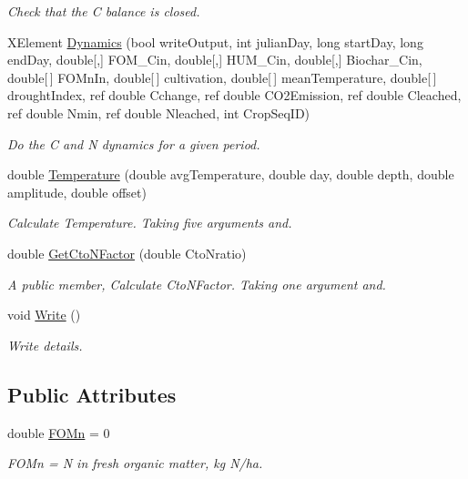 \begin{DoxyCompactItemize}
\begin{DoxyCompactList}\small\item\em Check that the C balance is closed. \end{DoxyCompactList}\item 
X\+Element \mbox{\hyperlink{classctool2_a9443a20fe2c0134438a7e03c9821cee0}{Dynamics}} (bool write\+Output, int julian\+Day, long start\+Day, long end\+Day, double\mbox{[},\mbox{]} F\+O\+M\+\_\+\+Cin, double\mbox{[},\mbox{]} H\+U\+M\+\_\+\+Cin, double\mbox{[},\mbox{]} Biochar\+\_\+\+Cin, double\mbox{[}$\,$\mbox{]} F\+O\+Mn\+In, double\mbox{[}$\,$\mbox{]} cultivation, double\mbox{[}$\,$\mbox{]} mean\+Temperature, double\mbox{[}$\,$\mbox{]} drought\+Index, ref double Cchange, ref double C\+O2\+Emission, ref double Cleached, ref double Nmin, ref double Nleached, int Crop\+Seq\+ID)
\begin{DoxyCompactList}\small\item\em Do the C and N dynamics for a given period. \end{DoxyCompactList}\item 
double \mbox{\hyperlink{classctool2_af3b775757402d284e18dcf32a95f9e40}{Temperature}} (double avg\+Temperature, double day, double depth, double amplitude, double offset)
\begin{DoxyCompactList}\small\item\em Calculate Temperature. Taking five arguments and. \end{DoxyCompactList}\item 
double \mbox{\hyperlink{classctool2_a2376beb1addd3be35eb8a09213ab4003}{Get\+Cto\+N\+Factor}} (double Cto\+Nratio)
\begin{DoxyCompactList}\small\item\em A public member, Calculate Cto\+N\+Factor. Taking one argument and. \end{DoxyCompactList}\item 
\mbox{\label{classctool2_adc4e483898d5c40908e45b1daab820b3}} 
void \mbox{\hyperlink{classctool2_adc4e483898d5c40908e45b1daab820b3}{Write}} ()
\begin{DoxyCompactList}\small\item\em Write details. \end{DoxyCompactList}\end{DoxyCompactItemize}
\subsection*{Public Attributes}
\begin{DoxyCompactItemize}
\item 
\mbox{\label{classctool2_a2a658e8bff396aa74f6ce46404bd7121}} 
double \mbox{\hyperlink{classctool2_a2a658e8bff396aa74f6ce46404bd7121}{F\+O\+Mn}} = 0
\begin{DoxyCompactList}\small\item\em F\+O\+Mn = N in fresh organic matter, kg N/ha. \end{DoxyCompactList}\end{DoxyCompactItemize}


